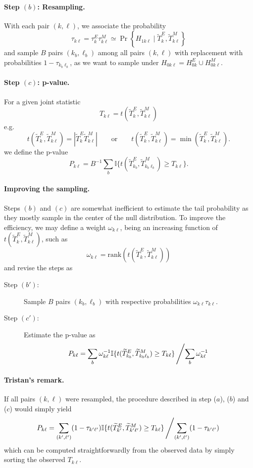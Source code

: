 \documentclass[a4paper, 11pt]{article}
\newcommand{\Ibb}{\mathbb{I}}
\newcommand{\Tt}{\widetilde{T}}
\begin{document}
\paragraph{Step $(b)$: Resampling.} With each pair $(k, \ell)$, we associate the probability
$$
\tau_{k\ell} = \tau^E_k \tau^M_{k\ell} \simeq \Pr\left\{H_{1k\ell} \mid \Tt^E_k,  \Tt^M_{k\ell}\right\}
$$
and sample $B$ pairs $(k_b, \ell_b)$ among all pairs $(k, \ell)$ with replacement with probabilities $1 - \tau_{k_b\ell_b}$, as we want to sample under $H_{0k\ell} = H^E_{0k} \cup H^M_{0k\ell}$. 

\paragraph{Step $(c)$: p-value.} For a given joint statistic 
$$
T_{k\ell} = t(\Tt^E_k, \Tt^M_{k\ell})
$$
e.g.
$$
t(\Tt^E_k, \Tt^M_{k\ell}) = | \Tt^E_k \Tt^M_{k\ell} |
\qquad \text{or} \qquad
t(\Tt^E_k, \Tt^M_{k\ell}) = \min(\Tt^E_k, \Tt^M_{k\ell}).
$$
we define the p-value
$$
P_{k\ell} = B^{-1} \sum_b \Ibb\{t(\Tt^E_{k_b}, \Tt^M_{k_b\ell_b}) \geq T_{k\ell}\}.
$$

\paragraph{Improving the sampling.} Steps $(b)$ and $(c)$ are somewhat inefficient to estimate  the tail probability as they mostly sample in the center of the null distribution. To improve the efficiency, we may define a weight $\omega_{k\ell}$, being an increasing function of $t(\Tt^E_k, \Tt^M_{k\ell})$, such as
$$
\omega_{k\ell} = \text{rank}(t(\Tt^E_k, \Tt^M_{k\ell}))
$$
and revise the steps as
\begin{description}
 \item[Step $(b')$:] Sample $B$ pairs $(k_b, \ell_b)$ with respective probabilities $\omega_{k\ell} \tau_{k\ell}$.
 \item[Step $(c')$:] Estimate the p-value as
 $$
 P_{k\ell} = \sum_b \omega_{k\ell}^{-1} \Ibb\{t(\Tt^E_{k_b}, \Tt^M_{k_b\ell_b}) \geq T_{k\ell}\} \left/ \sum_b \omega_{k\ell}^{-1} \right.
 $$
\end{description}

\paragraph{Tristan's remark.} If all pairs $(k, \ell)$ were resampled, the procedure described in step ($a$), ($b$) and ($c$) would simply yield
$$
P_{k\ell} 
= \sum_{(k', \ell')} (1-\tau_{k'\ell'}) \Ibb\{t(\Tt^E_{k'}, \Tt^M_{k'\ell'}) \geq T_{k\ell}\}
\left/ \sum_{(k', \ell')} (1-\tau_{k'\ell'}) \right.
$$
which can be computed straightforwardly from the observed data by simply sorting the observed $T_{k\ell}$.
\end{document}
